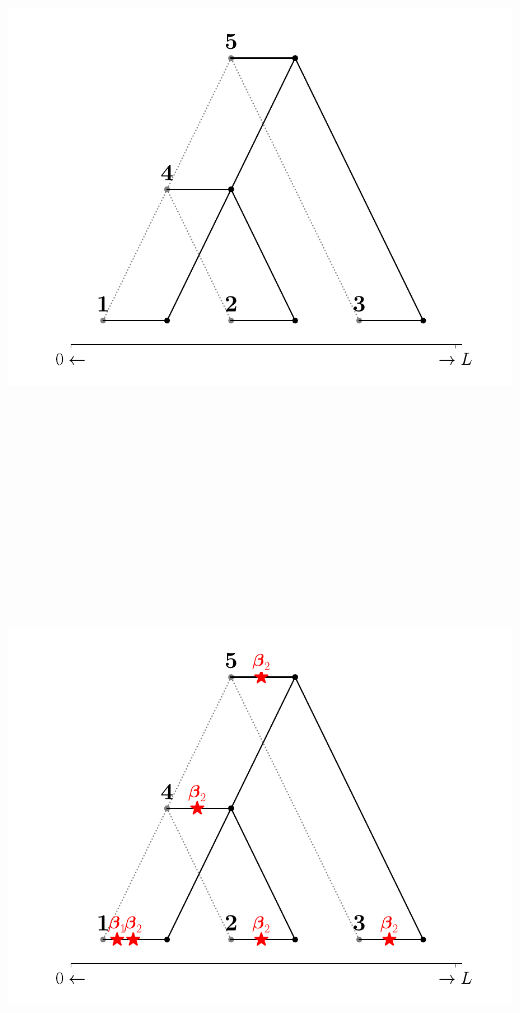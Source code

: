 \documentclass[
  letterpaper,
  DIV=11,
  numbers=noendperiod]{scrartcl}
\begin{document}
\begin{center}
\includegraphics[width=\linewidth,height=6.25in,keepaspectratio]{slides_files/mediabag/imgs/tree-branch.pdf}
\end{center}

\begin{center}
\includegraphics[width=\linewidth,height=6.25in,keepaspectratio]{slides_files/mediabag/imgs/tree-0.pdf}
\end{center}
\end{document}
